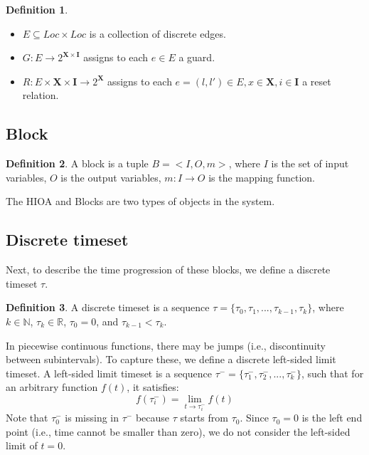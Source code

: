 \documentclass[twoside,a4paper,12pt]{article}
\theoremstyle{definition}
\newtheorem{definition}{Definition}
\begin{document}
\begin{definition}
\begin{itemize}
		\item $E \subseteq Loc \times Loc$ is a collection of discrete edges.
		\item $G : E \rightarrow 2^{ \mathbf{X} \times \mathbf{I} }$ assigns to each $e \in E$ a guard.
		\item $R : E \times \mathbf{X} \times \mathbf{I} \rightarrow 2^{\mathbf{X}}$ assigns to each $e = (l,l')\in E, x\in \mathbf{X}, i \in \mathbf{I}$ a reset relation.
	\end{itemize}
	\label{def:HIOA}
\end{definition}

\subsection{Block}
\begin{definition}
	A block is a tuple $B = <I, O, m>$, where $I$ is the set of input variables, $O$ is the output variables, $m : I \rightarrow O$ is the mapping function.
\end{definition}
The HIOA and Blocks are two types of objects in the system. 

\subsection{Discrete timeset}
Next, to describe the time progression of these blocks, we define a discrete timeset $\tau$.
\begin{definition}
	A discrete timeset is a sequence $\tau = \{ \tau_0, \tau_1, ..., \tau_{k-1}, \tau_{k} \}$, where $k \in \mathbb{N}$, $\tau_k \in \mathbb{R}$, $\tau_0 = 0$, and $\tau_{k-1} < \tau_{k}$.
	\label{ch1:def:timeset}
\end{definition}
In piecewise continuous functions, there may be jumps (i.e., discontinuity between subintervals). To capture these, we define a discrete left-sided limit timeset.
A left-sided limit timeset is a sequence $\tau^{-} = \{ \tau_1^{-}, \tau_2^{-}, ... , \tau_k^{-} \}$, such that for an arbitrary function $f(t)$, it satisfies:
\begin{equation}
f(\tau_i^{-}) = \lim\limits_{t\rightarrow\tau_i^{-}} f(t)
\end{equation}
Note that $\tau_0^-$ is missing in $\tau^-$ because $\tau$ starts from $\tau_0$. Since $\tau_0 = 0$ is the left end point (i.e., time cannot be smaller than zero), we do not consider the left-sided limit of $t=0$.
\end{document}
